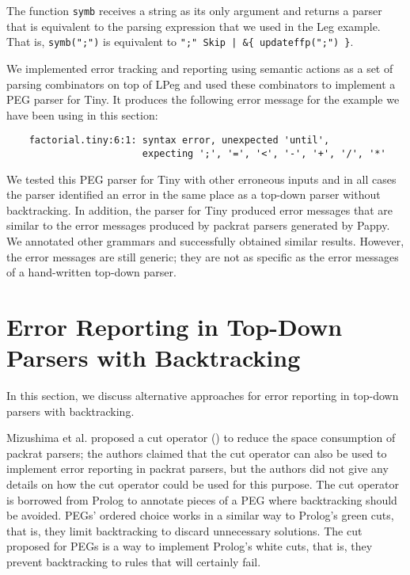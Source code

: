\documentclass[3p,12pt,singlecolumn]{elsarticle}
\begin{document}
The function \texttt{symb} receives a string as its only argument and returns a parser that is equivalent to the parsing expression that we used in the Leg example.
That is, \verb'symb(";")' is equivalent to
\verb'";" Skip | &{ updateffp(";") }'.

We implemented error tracking and reporting using semantic actions
as a set of parsing combinators on top of LPeg and used these
combinators to implement a PEG parser for Tiny.
It produces the following error message for the example we have
been using in this section:

\begin{verbatim}
    factorial.tiny:6:1: syntax error, unexpected 'until',
                        expecting ';', '=', '<', '-', '+', '/', '*'
\end{verbatim}

We tested this PEG parser for Tiny with other erroneous inputs and in all
cases the parser identified an error in the same place as a top-down
parser without backtracking.
In addition, the parser for Tiny produced error messages that are
similar to the error messages produced by packrat parsers generated
by Pappy.
We annotated other grammars and successfully obtained
similar results.
However, the error messages are still generic; they are not
as specific as the error messages of a hand-written top-down
parser.


\section{Error Reporting in Top-Down Parsers with Backtracking} 
\label{sec:rel}

In this section, we discuss alternative approaches for error reporting
in top-down parsers with backtracking.

Mizushima et al. \cite{mizushima2010php} proposed a cut operator
() to reduce the space consumption of packrat parsers;
the authors claimed that the cut operator can also be used to
implement error reporting in packrat parsers, but the authors did
not give any details on how the cut operator could be used for this
purpose.
The cut operator is borrowed from Prolog to annotate pieces of
a PEG where backtracking should be avoided.
PEGs' ordered choice works in a similar way to Prolog's green cuts,
that is, they limit backtracking to discard unnecessary solutions.
The cut proposed for PEGs is a way to implement Prolog's white cuts,
that is, they prevent backtracking to rules that will certainly fail.
\end{document}
